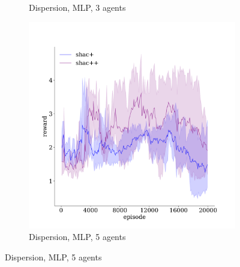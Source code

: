 \begin{figure}[!t]
\begin{subfigure}[b]{0.32\textwidth}
        \caption{Dispersion, MLP, 3 agents}
        \label{fig:dispersion-ablation-mlp-3}
    \end{subfigure}
    \begin{subfigure}[b]{0.32\textwidth}
        \includegraphics[width=\textwidth]{figs/dispersion-ablation-5-mlp.pdf}
        \caption{Dispersion, MLP, 5 agents}
        \label{fig:dispersion-ablation-mlp-5}
    \end{subfigure}


\end{figure}
